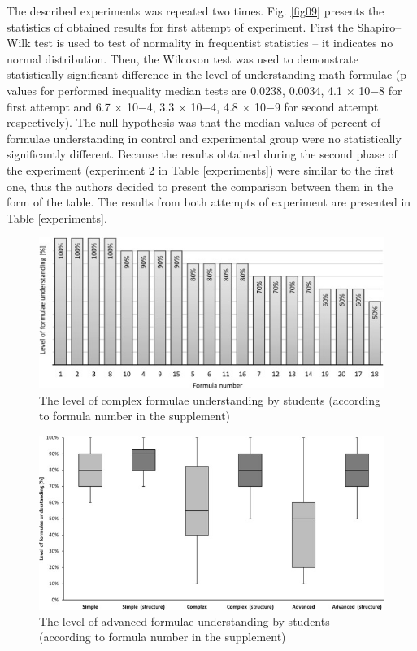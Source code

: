 \documentclass[12pt,1p]{elsarticle}
\begin{document}
	The described experiments was repeated two times. Fig. \ref{fig09} presents the statistics of obtained results for first attempt of experiment. First the Shapiro–Wilk test is used to test of normality in frequentist statistics – it indicates no normal distribution. Then, the Wilcoxon test was used to demonstrate statistically significant difference in the level of understanding math formulae (p-values for performed inequality median tests are 0.0238, 0.0034, 4.1 × 10−8 for first attempt and 6.7 × 10−4, 3.3 × 10−4, 4.8 × 10−9 for second attempt respectively). The null hypothesis was that the median values of percent of formulae understanding in control and experimental group were no statistically significantly different. Because the results obtained during the second phase of the experiment (experiment 2 in Table \ref{experiments}) were similar to the first one, thus the authors decided to present the comparison between them in the form of the table. The results from both attempts of experiment are presented in Table \ref{experiments}.
	
\begin{figure}[t]
\centering
\includegraphics[width=5in]{./pics/7}
\caption{The level of complex formulae understanding by students (according to formula number in the supplement)}
\label{fig07}
\end{figure}		
	
\begin{figure}[t]
\centering
\includegraphics[width=5in]{./pics/8}
\caption{The level of advanced formulae understanding by students (according to formula number in the supplement)}
\label{fig08}
\end{figure}
\end{document}
